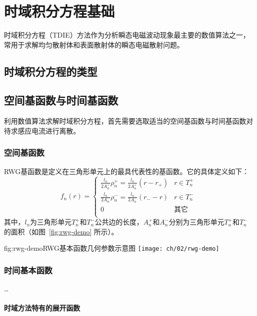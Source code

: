 \chapter{时域积分方程基础}

时域积分方程（TDIE）方法作为分析瞬态电磁波动现象最主要的数值算法之一，常用于求解均匀散射体和表面散射体的瞬态电磁散射问题。

\section{时域积分方程的类型}

\section{空间基函数与时间基函数}

利用数值算法求解时域积分方程，首先需要选取适当的空间基函数与时间基函数对待求感应电流进行离散。

\subsection{空间基函数}

RWG基函数是定义在三角形单元上的最具代表性的基函数。它的具体定义如下：
\begin{equation}
f_n(r)=
\begin{cases}
\frac{l_n}{2A_n^+}\rho_n^+=\frac{l_n}{2A_n^+}(r-r_+)&r\in T_n^+\\
\frac{l_n}{2A_n^-}\rho_n^-=\frac{l_n}{2A_n^-}(r_--r)&r\in T_n^-\\
0&\text{其它}\\
\end{cases}
\end{equation}
其中，$l_n$为三角形单元$T_n^+$和$T_n^-$公共边的长度，$A_n^+$和$A_n^-$分别为三角形单元$T_n^+$和$T_n^-$的面积（如图~\ref{fig:rwg-demo} 所示）。

\begin{Figure}{fig:rwg-demo}{RWG基本函数几何参数示意图}
  \texttt{[image: ch/02/rwg-demo]}
\end{Figure}

\subsection{时间基本函数}

\ldots

\subsubsection{时域方法特有的展开函数}

